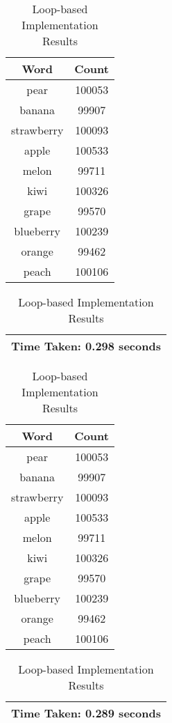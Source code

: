 \documentclass[]{acmsiggraph}
\begin{document}
\begin{table}[H]
\centering
\begin{minipage}{.45\textwidth}
  \centering
  \caption{MapReduce Implementation Results}
  \begin{tabular}{|c|c|}
    \hline
    Word & Count \\
    \hline
    pear & 100053 \\
    banana & 99907 \\
    strawberry & 100093 \\
    apple & 100533 \\
    melon & 99711 \\
    kiwi & 100326 \\
    grape & 99570 \\
    blueberry & 100239 \\
    orange & 99462 \\
    peach & 100106 \\
    \hline
  \end{tabular}
  \vspace{0.5cm}
  \begin{tabular}{|c|c|}
    \hline
    \multicolumn{2}{|c|}{Time Taken: 0.298 seconds} \\
    \hline
  \end{tabular}
\end{minipage}%
\hfill
\begin{minipage}{.45\textwidth}
  \centering
  \caption{Loop-based Implementation Results}
  \begin{tabular}{|c|c|}
    \hline
    Word & Count \\
    \hline
    pear & 100053 \\
    banana & 99907 \\
    strawberry & 100093 \\
    apple & 100533 \\
    melon & 99711 \\
    kiwi & 100326 \\
    grape & 99570 \\
    blueberry & 100239 \\
    orange & 99462 \\
    peach & 100106 \\
    \hline
  \end{tabular}
  \vspace{0.5cm}
  \begin{tabular}{|c|c|}
    \hline
    \multicolumn{2}{|c|}{Time Taken: 0.289 seconds} \\
    \hline
  \end{tabular}
\end{minipage}
\end{table}
\end{document}
